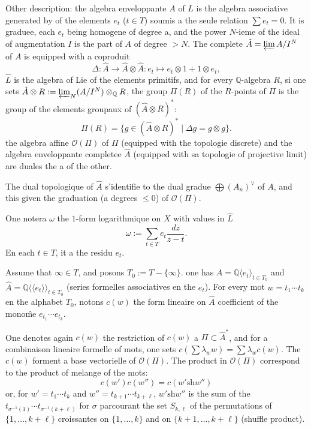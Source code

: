 \documentclass[11pt,a4paper]{article}
\theoremstyle{plain}
\theoremstyle{definition}
\newcommand{\Q}{\mathbb{Q}}
\newcommand{\shuffle}{{\text{sh}}}
\begin{document}
Other description: the algebra enveloppante $A$ of $L$ is the algebra associative generated by of the elements $e_t$ ($t \in T$) soumis a the seule relation $\sum e_t = 0$. It is graduee, each $e_t$ being homogene of degree a, and the power $N$-ieme of the ideal of augmentation $I$ is the part of $A$ of degree $> N$. The complete $\hat{A} = \varprojlim A/I^N$ of $A$ is equipped with a coproduit
\[
\Delta : \hat{A} \to \hat{A} \otimes \hat{A} : e_t \mapsto e_t \otimes 1 + 1 \otimes e_t,
\]
$\hat{L}$ is the algebra of Lie of the elements primitifs, and for every $\Q$-algebra $R$, si one sets $\hat{A} \otimes R := \varprojlim_N (A/I^N) \otimes_{\Q} R$, the group $\Pi(R)$ of the $R$-points of $\Pi$ is the group of the elements groupaux of $(\hat{A} \otimes R)^*$:
\begin{equation}\label{eq:3.1.3}
\Pi(R) = \{g \in (\hat{A} \otimes R)^* \mid \Delta g = g \otimes g\}.
\end{equation}
the algebra affine $\mathcal{O}(\Pi)$ of $\Pi$ (equipped with the topologie discrete) and the algebra enveloppante completee $\hat{A}$ (equipped with sa topologie of projective limit) are duales the a of the other.

The dual topologique of $\hat{A}$ s'identifie to the dual gradue $\bigoplus (A_n)^\vee$ of $A$, and this given the graduation (a degrees $\leq 0$) of $\mathcal{O}(\Pi)$.

One notera $\omega$ the $1$-form logarithmique on $X$ with values in $\hat{L}$
\begin{equation}\label{eq:3.1.4}
\omega := \sum_{t \in T} e_t \frac{dz}{z-t}.
\end{equation}
En each $t \in T$, it a the residu $e_t$.

Assume that $\infty \in T$, and posons $T_0 := T - \{\infty\}$. one has $A = \Q\langle e_t \rangle_{t \in T_0}$ and $\hat{A} = \Q\langle\langle e_t \rangle\rangle_{t \in T_0}$ (series formelles associatives en the $e_t$). For every mot $w = t_1 \cdots t_k$ en the alphabet $T_0$, notons $c(w)$ the form lineaire on $\hat{A}$ coefficient of the mono\^me $e_{t_1} \cdots e_{t_k}$.

One denotes again $c(w)$ the restriction of $c(w)$ a $\Pi \subset \hat{A}^*$, and for a combinaison lineaire formelle of mots, one sets $c(\sum \lambda_w w) = \sum \lambda_w c(w)$. The $c(w)$ forment a base vectorielle of $\mathcal{O}(\Pi)$. The product in $\mathcal{O}(\Pi)$ correspond to the product of melange of the mots:
\begin{equation}\label{eq:3.1.5}
c(w')c(w'') = c(w' \shuffle w'')
\end{equation}
or, for $w' = t_1 \cdots t_k$ and $w'' = t_{k+1} \cdots t_{k+\ell}$, $w' \shuffle w''$ is the sum of the $t_{\sigma^{-1}(1)} \cdots t_{\sigma^{-1}(k+\ell)}$ for $\sigma$ parcourant the set $S_{k,\ell}$ of the permutations of $\{1,\ldots,k+\ell\}$ croissantes on $\{1,\ldots,k\}$ and on $\{k+1,\ldots,k+\ell\}$ (shuffle product).
\end{document}
